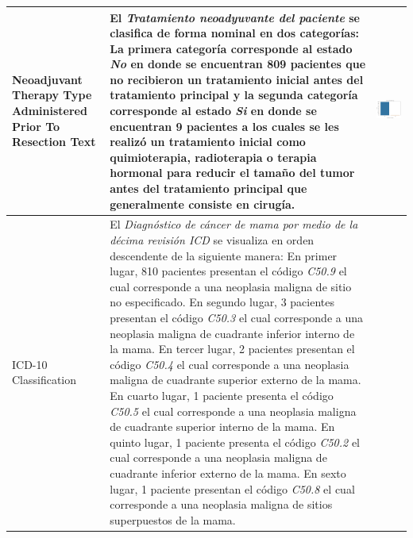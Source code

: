 \begin{table}[!htb]
	\footnotesize
	\begin{threeparttable}
		\begin{tabular}{p{2.5cm} p{7cm} p{6.5cm}} \toprule
			Neoadjuvant Therapy Type Administered Prior To Resection Text
			& El \textit{Tratamiento neoadyuvante del paciente} se clasifica de forma nominal en dos categorías: La primera categoría corresponde al estado \textit{No} en donde se encuentran 809 pacientes que no recibieron un tratamiento inicial antes del tratamiento principal y la segunda categoría corresponde al estado \textit{Si} en donde se encuentran 9 pacientes a los cuales se les realizó un tratamiento inicial como quimioterapia, radioterapia o terapia hormonal para reducir el tamaño del tumor antes del tratamiento principal que generalmente consiste en cirugía.
			& \begin{center}\includegraphics[width=1\linewidth]{NOTEBOOK/IMAGENES_DESCRIPTIVAS/23_neoadjuvant_therapy}\end{center}
			\\ \hline
			
			ICD-10 Classification
			& El \textit{Diagnóstico de cáncer de mama por medio de la décima revisión ICD} se visualiza en orden descendente de la siguiente manera: En primer lugar, 810 pacientes presentan el código \textit{C50.9} el cual corresponde a una neoplasia maligna de sitio no especificado. En segundo lugar, 3 pacientes presentan el código \textit{C50.3} el cual corresponde a una neoplasia maligna de cuadrante inferior interno de la mama. En tercer lugar, 2 pacientes presentan el código \textit{C50.4} el cual corresponde a una neoplasia maligna de cuadrante superior externo de la mama. En cuarto lugar, 1 paciente presenta el código \textit{C50.5} el cual corresponde a una neoplasia maligna de cuadrante superior interno de la mama. En quinto lugar, 1 paciente presenta el código \textit{C50.2} el cual corresponde a una neoplasia maligna de cuadrante inferior externo de la mama. En sexto lugar, 1 paciente presentan el código \textit{C50.8} el cual corresponde a una neoplasia maligna de sitios superpuestos de la mama.
			

\end{tabular}
\end{threeparttable}
\end{table}
